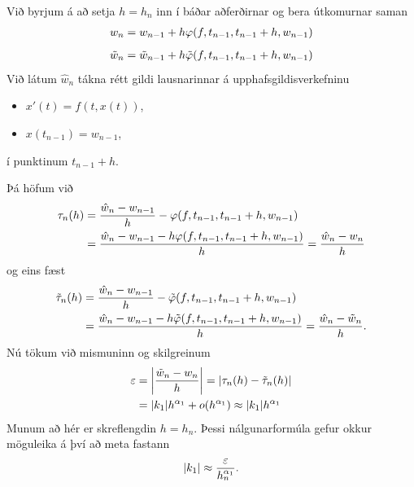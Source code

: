 \documentclass[letterpaper,10pt,icelandic]{sphinxmanual}
\begin{document}
Við byrjum á að setja \(h=h_{n}\) inn í báðar aðferðirnar og bera
útkomurnar saman
\begin{gather}
\begin{split}w_{n} = w_{n-1} + h\varphi(f,t_{n-1},t_{n-1}+h,w_{n-1})\end{split}\notag
\end{gather}\begin{gather}
\begin{split}\tilde w_{n} = \tilde w_{n-1} +
h\tilde\varphi(f,t_{n-1},t_{n-1}+h,w_{n-1})\end{split}\notag
\end{gather}
Við látum \(\hat w_{n}\) tákna rétt gildi lausnarinnar á
upphafsgildisverkefninu
\begin{itemize}
\item {} 
\(x'(t)=f(t,x(t))\),

\item {} 
\(x(t_{n-1})=w_{n-1}\),

\end{itemize}

í punktinum \(t_{n-1}+h\).

Þá höfum við
\begin{gather}
\begin{split}\begin{aligned}
 \tau_n(h)&=\dfrac{\hat
w_{n}-w_{n-1}}{h}-\varphi(f,t_{n-1},t_{n-1}+h,w_{n-1})\\
&=\dfrac{\hat
w_{n}-w_{n-1}-h\varphi(f,t_{n-1},t_{n-1}+h,w_{n-1})}{h}
=\dfrac {\hat w_{n}-w_{n}}{h}\end{aligned}\end{split}\notag
\end{gather}
og eins fæst
\begin{gather}
\begin{split}\begin{aligned}
\tilde \tau_n(h)
&=\dfrac{\hat
w_{n}-w_{n-1}}{h}-\tilde \varphi(f,t_{n-1},t_{n-1}+h,w_{n-1})\\
&=\dfrac{\hat
w_{n}-w_{n-1}-h\tilde \varphi(f,t_{n-1},t_{n-1}+h,w_{n-1})}{h}
=\dfrac {\hat w_{n}-\tilde w_{n}}{h}. \end{aligned}\end{split}\notag
\end{gather}
Nú tökum við mismuninn og skilgreinum
\begin{gather}
\begin{split}\begin{aligned}
\varepsilon
&= \left|\frac{\tilde w_{n}-w_{n}}{h}\right|=|\tau_n(h)-\tilde
  \tau_n(h)|\\
&=|k_1|h^{\alpha_1}+o(h^{\alpha_1}) \approx |k_1|h^{\alpha_1}  \end{aligned}\end{split}\notag
\end{gather}
Munum að hér er skreflengdin \(h=h_{n}\). Þessi nálgunarformúla
gefur okkur möguleika á því að meta fastann
\begin{gather}
\begin{split}|k_1|\approx
\dfrac\varepsilon{h_{n}^{\alpha_1}}.\end{split}\notag
\end{gather}
\end{document}
